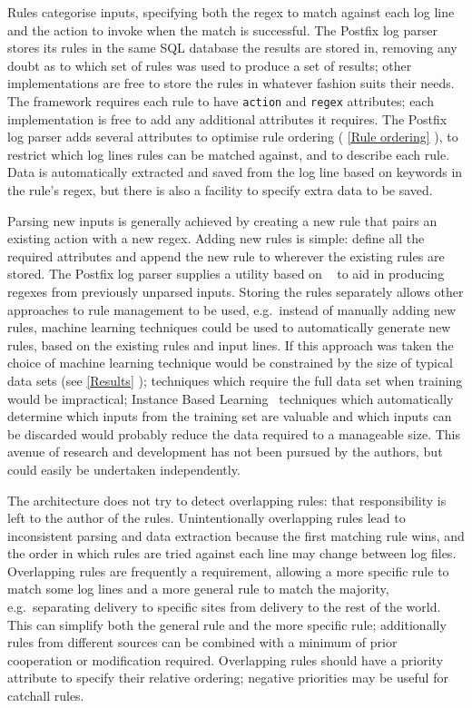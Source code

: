 \documentclass{svmult}
\newcommand{\sectionref}[1]{%
    \textsection{}\vref*{#1}%
}
\begin{document}
Rules categorise inputs, specifying both the regex to match against each
log line and the action to invoke when the match is successful.  The
Postfix log parser stores its rules in the same SQL database the results
are stored in, removing any doubt as to which set of rules was used to
produce a set of results; other implementations are free to store the rules
in whatever fashion suits their needs.  The framework requires each rule to
have \texttt{action} and \texttt{regex} attributes; each implementation is
free to add any additional attributes it requires.  The Postfix log parser
adds several attributes to optimise rule ordering (\sectionref{Rule
ordering}), to restrict which log lines rules can be matched against, and
to describe each rule.  Data is automatically extracted and saved from the
log line based on keywords in the rule's regex, but there is also a
facility to specify extra data to be saved.

Parsing new inputs is generally achieved by creating a new rule that pairs
an existing action with a new regex.  Adding new rules is simple: define
all the required attributes and append the new rule to wherever the
existing rules are stored.  The Postfix log parser supplies a utility based
on \SLCT{}~\cite{slct-paper} to aid in producing regexes from previously
unparsed inputs.  Storing the rules separately allows other approaches to
rule management to be used, e.g.\ instead of manually adding new rules,
machine learning techniques could be used to automatically generate new
rules, based on the existing rules and input lines.  If this approach was
taken the choice of machine learning technique would be constrained by the
size of typical data sets (see \sectionref{Results}); techniques which
require the full data set when training would be impractical; Instance
Based Learning~\cite{instance-based-learning} techniques which
automatically determine which inputs from the training set are valuable and
which inputs can be discarded would probably reduce the data required to a
manageable size.  This avenue of research and development has not been
pursued by the authors, but could easily be undertaken independently.

The architecture does not try to detect overlapping rules: that
responsibility is left to the author of the rules.  Unintentionally
overlapping rules lead to inconsistent parsing and data extraction because
the first matching rule wins, and the order in which rules are tried
against each line may change between log files.  Overlapping rules are
frequently a requirement, allowing a more specific rule to match some log
lines and a more general rule to match the majority, e.g.\ separating
\SMTP{} delivery to specific sites from \SMTP{} delivery to the rest of the
world.  This can simplify both the general rule and the more specific rule;
additionally rules from different sources can be combined with a minimum of
prior cooperation or modification required.  Overlapping rules should have
a priority attribute to specify their relative ordering; negative
priorities may be useful for catchall rules.
\end{document}

